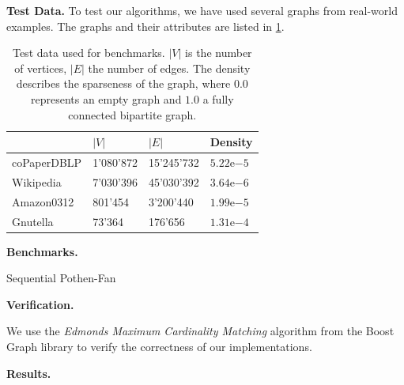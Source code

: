\documentclass[letterpaper]{article}
\newcommand{\mypar}[1]{{\bf #1.}}
\begin{document}
\mypar{Test Data}
To test our algorithms, we have used several graphs from real-world examples. The graphs and their attributes are listed in \ref{table:testdata}. \\
\begin{table}
\centering
\begin{tabular}{ |l|l|l|l| }
\hline
 & $\lvert V \rvert$ & $\lvert E \rvert$ & Density \\ \hline
coPaperDBLP & 1'080'872 & 15'245'732 & $5.22\mathrm{e}{-5}$ \\ \hline
Wikipedia & 7'030'396 & 45'030'392 & $3.64\mathrm{e}{-6}$ \\ \hline
Amazon0312 & 801'454 & 3'200'440 & $1.99\mathrm{e}{-5}$ \\ \hline
Gnutella & 73'364 & 176'656 & $1.31\mathrm{e}{-4}$ \\ \hline
\end{tabular}
\caption{Test data used for benchmarks. $\lvert V \rvert$ is the number of vertices, $\lvert E \rvert$ the number of edges. The density describes the sparseness of the graph, where $0.0$ represents an empty graph and $1.0$ a fully connected bipartite graph.}
\label{table:testdata}
\end{table}
\mypar{Benchmarks}

Sequential Pothen-Fan

\mypar{Verification}

We use the \textit{Edmonds Maximum Cardinality Matching} algorithm \cite{BoostEdmonds} from the Boost Graph library  to verify the correctness of our implementations.

\mypar{Results}
%
\end{document}

